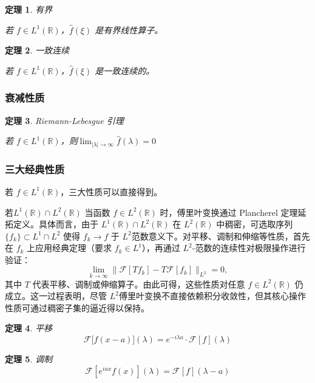 \documentclass[12pt,a4paper]{article}
\theoremstyle{plain}
\newtheorem{theorem}{定理}[section]
\theoremstyle{definition}
\theoremstyle{remark}
\begin{document}
\begin{theorem}有界
	
	若 \( f \in L^1(\mathbb{R}) \)，\(\hat{f}(\xi)\) 是有界线性算子。
\end{theorem}

\begin{theorem}一致连续
	
若 \( f \in L^1(\mathbb{R}) \)，\(\hat{f}(\xi)\) 是一致连续的。
\end{theorem}





\subsubsection{衰减性质}
 \begin{theorem}Riemann-Lebesgue 引理
 	
 若 \( f \in L^1(\mathbb{R}) \)，则$\lim_{|\lambda| \to \infty} \hat{f}(\lambda) = 0 $
 \end{theorem}
 


 \subsubsection{三大经典性质}
 若 \( f \in L^1(\mathbb{R}) \)，三大性质可以直接得到。
 
 若$ L^1(\mathbb{R}) \cap L^2(\mathbb{R})$
 当函数 \( f \in L^2(\mathbb{R}) \) 时，傅里叶变换通过 Plancherel 定理延拓定义。具体而言，由于 \( L^1(\mathbb{R}) \cap L^2(\mathbb{R}) \) 在 \( L^2(\mathbb{R}) \) 中稠密，可选取序列 \( \{f_k\} \subset L^1 \cap L^2 \) 使得 \( f_k \rightarrow f \) 于 \( L^2 \)范数意义下。对平移、调制和伸缩等性质，首先在 \( f_k \) 上应用经典定理（要求 \( f_k \in L^1 \)），再通过 \( L^2 \)-范数的连续性对极限操作进行验证：
 \[
 \lim_{k \rightarrow \infty} \| \mathcal{F}[T f_k] - T \mathcal{F}[f_k] \|_{L^2} = 0,
 \]
 其中 \( T \) 代表平移、调制或伸缩算子。由此可得，这些性质对任意 \( f \in L^2(\mathbb{R}) \) 仍成立。这一过程表明，尽管 \( L^2 \)傅里叶变换不直接依赖积分收敛性，但其核心操作性质可通过稠密子集的逼近得以保持。
  \begin{theorem}平移
 \[
 \mathcal{F}\big[f(x-a)\big](\lambda) = e^{-i\lambda a} \cdot \mathcal{F}[f](\lambda)
 \]
\end{theorem}

 \begin{theorem}调制
 \[
 \mathcal{F}\left[e^{iax}f(x)\right](\lambda) = \mathcal{F}[f](\lambda - a)
 \]
\end{theorem}
\end{document}
